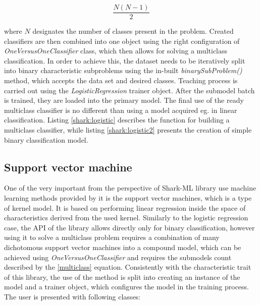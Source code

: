 \begin{equation}
	\frac{N(N-1)}{2}	
	\label{multiclass}
\end{equation}

where $N$ designates the number of classes present in the problem. Created classifiers are then combined into one object using the right configuration of \textit{OneVersusOneClassifier} class, which then allows for solving a multiclass classification. In order to achieve this, the dataset needs to be iteratively split into binary characteristic subproblems using the in-built \textit{binarySubProblem()} method, which accepts the data set and desired classes. Teaching process is carried out using the \textit{LogisticRegression} trainer object. After the submodel batch is trained, they are loaded into the primary model. The final use of the ready multiclass classifier is no different than using a model acquired eg. in linear classification. Listing \ref{shark:logistic} describes the function for building a multiclass classifier, while listing \ref{shark:logistic2} presents the creation of simple binary classification model. 



\subsection{Support vector machine}

One of the very important from the perspective of Shark-ML library use machine learning methods provided by it is the support vector machines, which is a type of kernel model. It is based on performing linear regression inside the space of characteristics derived from the used kernel. Similarly to the logistic regression case, the API of the library allows directly only for binary classification, however using it to solve a multiclass problem requires a combination of many dichotomous support vector machines into a compound model, which can be achieved using \textit{OneVersusOneClassifier} and requires the submodels count described by the \ref{multiclass} equation. Consistently with the characteristic trait of this library, the use of the method is split into creating an instance of the model and a trainer object, which configures the model in the training process. The user is presented with following classes:

